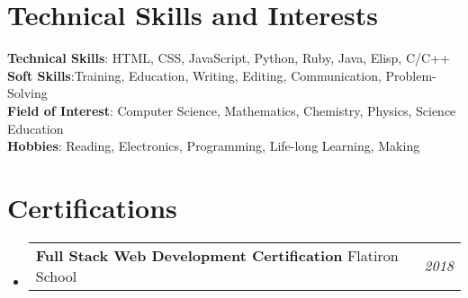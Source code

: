 \documentclass[a4paper,12pt]{article}
\makeatletter
\newcommand{\resumePOR}[3]{
\vspace{0.5mm}\item
    \begin{tabular*}{0.97\textwidth}[t]{l@{\extracolsep{\fill}}r}
        \textbf{#1}\hspace{0.3mm}#2 & \textit{\small{#3}} 
    \end{tabular*}
    \vspace{-2mm}
}
\newcommand{\resumeSubHeadingListStart}{\begin{itemize}[leftmargin=*,labelsep=0mm]}
\newcommand{\resumeSubHeadingListEnd}{\end{itemize}\vspace{2mm}}
\makeatother
\begin{document}
\section{\textbf{Technical Skills and Interests}}
 \begin{itemize}[leftmargin=0.1in, label={}]
    \small{\item{
     \textbf{Technical Skills}{: HTML, CSS, JavaScript, Python, Ruby, Java, Elisp, C/C++} \\
     \textbf{Soft Skills}{:Training, Education, Writing, Editing, Communication, Problem-Solving } \\
     \textbf{Field of Interest}{: Computer Science, Mathematics, Chemistry, Physics, Science Education } \\
     \textbf{Hobbies}{: Reading, Electronics, Programming, Life-long Learning, Making} \\
    }}
 \end{itemize}
 \vspace{-16pt}



    




\section{\textbf{Certifications}}
\vspace{-0.4mm}
\resumeSubHeadingListStart
\resumePOR{Full Stack Web Development Certification } %
    {Flatiron School } %
    {2018} %
    


\resumeSubHeadingListEnd
\vspace{-5mm}



\end{document}
